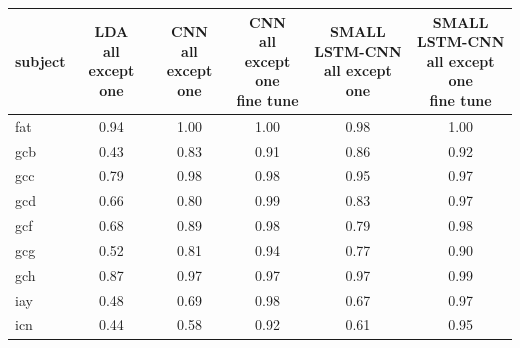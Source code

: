 \documentclass[
12pt, %
english, %
doublespacing, %
headsepline, %
]{MastersDoctoralThesis} %
\begin{document}
\begin{table}[t]
	\centering
	\label{table:AllExceptOne}	
	\begin{tabular}{l|ccccc}
		\toprule
		{subject} & \makecell{LDA \\ all except one} &  \makecell{CNN\\all except one}&  \makecell{CNN\\all except one\\fine tune}& \makecell{SMALL LSTM-CNN\\all except one}&\makecell{SMALL LSTM-CNN\\all except one \\ fine tune} \\
		\midrule
		fat     &                  0.94 &                  1.00 &                            1.00 &                             0.98 &                                               1.00 \\
		gcb     &                  0.43 &                  0.83 &                            0.91 &                             0.86 &                                               0.92 \\
		gcc     &                  0.79 &                  0.98 &                            0.98 &                             0.95 &                                               0.97 \\
		gcd     &                  0.66 &                  0.80 &                            0.99 &                             0.83 &                                               0.97 \\
		gcf     &                  0.68 &                  0.89 &                            0.98 &                             0.79 &                                               0.98 \\
		gcg     &                  0.52 &                  0.81 &                            0.94 &                             0.77 &                                               0.90 \\
		gch     &                  0.87 &                  0.97 &                            0.97 &                             0.97 &                                               0.99 \\
		iay     &                  0.48 &                  0.69 &                            0.98 &                             0.67 &                                               0.97 \\
		icn     &                  0.44 &                  0.58 &                            0.92 &                             0.61 &                                               0.95 \\

\end{tabular}
\end{table}
\end{document}
